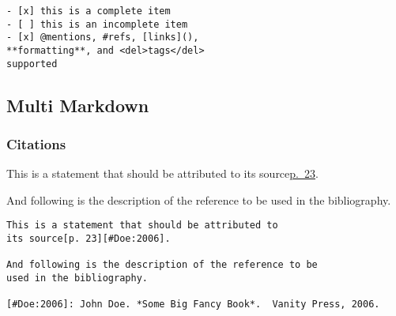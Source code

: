 \documentclass[
]{article}
\begin{document}
\begin{verbatim}
- [x] this is a complete item
- [ ] this is an incomplete item
- [x] @mentions, #refs, [links](),
**formatting**, and <del>tags</del>
supported
\end{verbatim}

\hypertarget{multi-markdown}{%
\subsection{Multi Markdown}\label{multi-markdown}}

\hypertarget{citations}{%
\subsubsection{Citations}\label{citations}}

This is a statement that should be attributed to its
source\href{John\%20Doe.\%20*Some\%20Big\%20Fancy\%20Book*.\%20Vanity\%20Press,\%202006.}{p.~23}.

And following is the description of the reference to be used in the
bibliography.

\begin{verbatim}
This is a statement that should be attributed to
its source[p. 23][#Doe:2006].

And following is the description of the reference to be
used in the bibliography.

[#Doe:2006]: John Doe. *Some Big Fancy Book*.  Vanity Press, 2006.
\end{verbatim}
\end{document}
